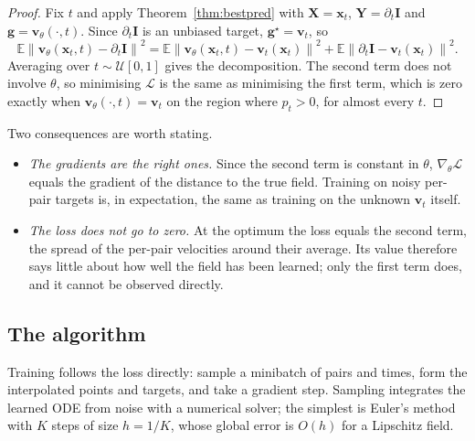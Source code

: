 \documentclass[11pt,a4paper]{article}
\numberwithin{equation}{section}     %
\theoremstyle{plain}        %
\theoremstyle{definition}   %
\theoremstyle{remark}       %
\begin{document}
\begin{proof}
Fix $t$ and apply Theorem~\ref{thm:bestpred} with $\mathbf{X}=\mathbf{x}_t$, $\mathbf{Y}=\partial_t\mathbf{I}$ and $\mathbf{g}=\mathbf{v}_\theta(\cdot,t)$. Since $\partial_t\mathbf{I}$ is an unbiased target, $\mathbf{g}^\star=\mathbf{v}_t$, so
\[
\mathbb{E}\left\|\mathbf{v}_\theta(\mathbf{x}_t,t)-\partial_t\mathbf{I}\right\|^2=\mathbb{E}\left\|\mathbf{v}_\theta(\mathbf{x}_t,t)-\mathbf{v}_t(\mathbf{x}_t)\right\|^2+\mathbb{E}\left\|\partial_t\mathbf{I}-\mathbf{v}_t(\mathbf{x}_t)\right\|^2 .
\]
Averaging over $t\sim\mathcal{U}[0,1]$ gives the decomposition. The second term does not involve $\theta$, so minimising $\mathcal{L}$ is the same as minimising the first term, which is zero exactly when $\mathbf{v}_\theta(\cdot,t)=\mathbf{v}_t$ on the region where $p_t>0$, for almost every $t$.
\end{proof}

Two consequences are worth stating.
\begin{itemize}
\item \emph{The gradients are the right ones.} Since the second term is constant in $\theta$, $\nabla_\theta\mathcal{L}$ equals the gradient of the distance to the true field. Training on noisy per-pair targets is, in expectation, the same as training on the unknown $\mathbf{v}_t$ itself.
\item \emph{The loss does not go to zero.} At the optimum the loss equals the second term, the spread of the per-pair velocities around their average. Its value therefore says little about how well the field has been learned; only the first term does, and it cannot be observed directly.
\end{itemize}

\subsection{The algorithm}

Training follows the loss directly: sample a minibatch of pairs and times, form the interpolated points and targets, and take a gradient step. Sampling integrates the learned ODE from noise with a numerical solver; the simplest is Euler's method with $K$ steps of size $h=1/K$, whose global error is $O(h)$ for a Lipschitz field.
\end{document}
